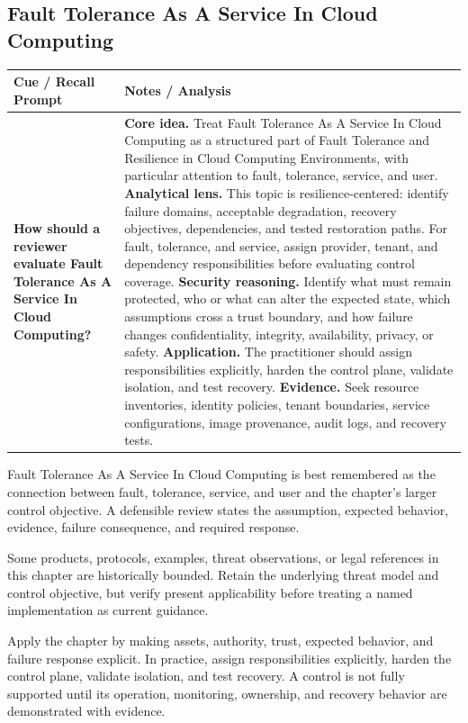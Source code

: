 \documentclass[11pt]{article}
\newcommand{\CornellHeader}{%
\rowcolor{Navy}\color{white}\bfseries Cue / Recall Prompt & \color{white}\bfseries Notes / Analysis\\\hline}
\newcommand{\CornellRow}[2]{%
\cellcolor{CueGray}\RaggedRight\textbf{#1} & \RaggedRight #2\\\hline}
\begin{document}
\subsection*{Fault Tolerance As A Service In Cloud Computing}
\begin{longtable}{>{\RaggedRight\arraybackslash}p{}|>{\RaggedRight\arraybackslash}p{}}
\CornellHeader
\CornellRow{How should a reviewer evaluate Fault Tolerance As A Service In Cloud Computing?}{\textbf{Core idea.} Treat Fault Tolerance As A Service In Cloud Computing as a structured part of Fault Tolerance and Resilience in Cloud Computing Environments, with particular attention to fault, tolerance, service, and user. \textbf{Analytical lens.} This topic is resilience-centered: identify failure domains, acceptable degradation, recovery objectives, dependencies, and tested restoration paths. For fault, tolerance, and service, assign provider, tenant, and dependency responsibilities before evaluating control coverage. \textbf{Security reasoning.} Identify what must remain protected, who or what can alter the expected state, which assumptions cross a trust boundary, and how failure changes confidentiality, integrity, availability, privacy, or safety. \textbf{Application.} The practitioner should assign responsibilities explicitly, harden the control plane, validate isolation, and test recovery. \textbf{Evidence.} Seek resource inventories, identity policies, tenant boundaries, service configurations, image provenance, audit logs, and recovery tests.}
\end{longtable}
\begin{topicsummary}
Fault Tolerance As A Service In Cloud Computing is best remembered as the connection between fault, tolerance, service, and user and the chapter's larger control objective. A defensible review states the assumption, expected behavior, evidence, failure consequence, and required response.
\end{topicsummary}
\begin{historybox}
Some products, protocols, examples, threat observations, or legal references in this chapter are historically bounded. Retain the underlying threat model and control objective, but verify present applicability before treating a named implementation as current guidance.
\end{historybox}
\begin{defensebox}
Apply the chapter by making assets, authority, trust, expected behavior, and failure response explicit. In practice, assign responsibilities explicitly, harden the control plane, validate isolation, and test recovery. A control is not fully supported until its operation, monitoring, ownership, and recovery behavior are demonstrated with evidence.
\end{defensebox}
\end{document}
